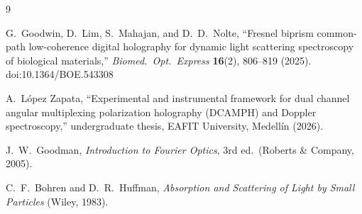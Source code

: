 \documentclass[11pt,a4paper]{article}
\begin{document}
\begin{thebibliography}{9}

G.~Goodwin, D.~Lim, S.~Mahajan, and D.~D.~Nolte,
``Fresnel biprism common-path low-coherence digital holography for dynamic
light scattering spectroscopy of biological materials,''
\emph{Biomed.\ Opt.\ Express} \textbf{16}(2), 806--819 (2025).
doi:10.1364/BOE.543308

A.~L\'opez Zapata,
``Experimental and instrumental framework for dual channel angular
multiplexing polarization holography (DCAMPH) and Doppler spectroscopy,''
undergraduate thesis, EAFIT University, Medell\'in (2026).

J.~W.~Goodman, \emph{Introduction to Fourier Optics}, 3rd ed.\
(Roberts \& Company, 2005).

C.~F.~Bohren and D.~R.~Huffman, \emph{Absorption and Scattering of Light by
Small Particles} (Wiley, 1983).

\end{thebibliography}
\end{document}
